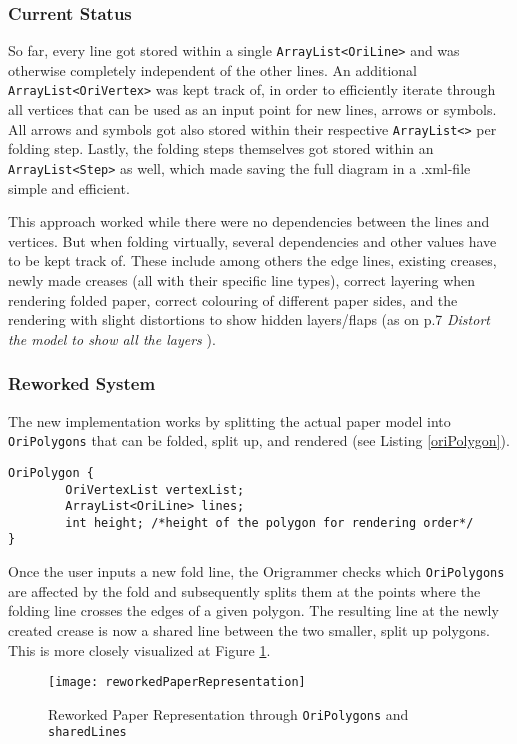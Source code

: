 \subsubsection*{Current Status}

So far, every line got stored within a single \texttt{ArrayList<OriLine>} and was otherwise completely independent of the other lines. An additional \texttt{ArrayList<OriVertex>} was kept track of, in order to efficiently iterate through all vertices that can be used as an input point for new lines, arrows or symbols. All arrows and symbols got also stored within their respective \texttt{ArrayList<>} per folding step. Lastly, the folding steps themselves got stored within an \texttt{ArrayList<Step>} as well, which made saving the full diagram in a .xml-file simple and efficient.

This approach worked while there were no dependencies between the lines and vertices. But when folding virtually, several dependencies and other values have to be kept track of. These include among others the edge lines, existing creases, newly made creases (all with their specific line types), correct layering when rendering folded paper, correct colouring of different paper sides, and the rendering with slight distortions to show hidden layers/flaps (as on p.7 \emph{Distort the model to show all the layers} \cite{origrammer}).

\subsubsection*{Reworked System}

The new implementation works by splitting the actual paper model into \texttt{OriPolygons} that can be folded, split up, and rendered (see Listing \ref{oriPolygon}).

\begin{lstlisting}[label=oriPolygon,caption=OriPolygon]
OriPolygon {
        OriVertexList vertexList; 
        ArrayList<OriLine> lines;
        int height; /*height of the polygon for rendering order*/
}
\end{lstlisting}

Once the user inputs a new fold line, the Origrammer checks which \texttt{OriPolygons} are affected by the fold and subsequently splits them at the points where the folding line crosses the edges of a given polygon. The resulting line at the newly created crease is now a shared line between the two smaller, split up polygons. This is more closely visualized at Figure \ref{fig:reworkedPaperRepresentation}.
 \begin{figure}[htbp]
	\centering
	\texttt{[image: reworkedPaperRepresentation]}
	\caption{Reworked Paper Representation through \texttt{OriPolygons} and \texttt{sharedLines}}
	\label{fig:reworkedPaperRepresentation}
\end{figure}

